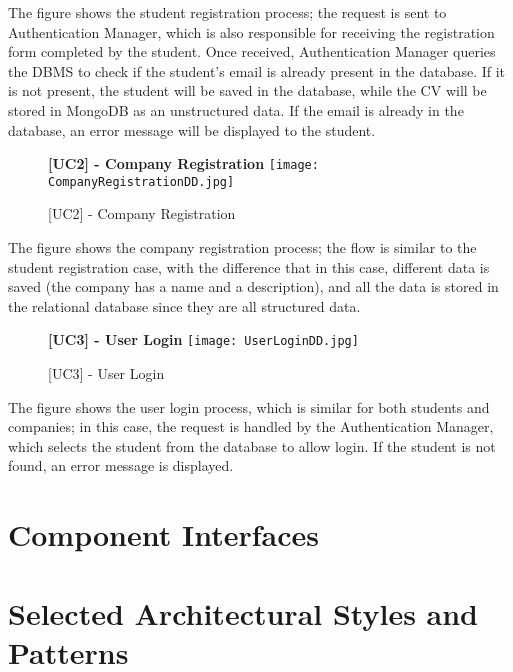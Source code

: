 		The figure shows the student registration process; the request is sent to Authentication Manager, which is also responsible for receiving the registration form completed by the student. Once received, Authentication Manager queries the DBMS to check if the student's email is already present in the database. If it is not present, the student will be saved in the database, while the CV will be stored in MongoDB as an unstructured data. If the email is already in the database, an error message will be displayed to the student.
		
		\begin{figure}[H]
			\centering
			{\bfseries [UC2] - Company Registration}
			\texttt{[image: CompanyRegistrationDD.jpg]}
			\caption{[UC2] - Company Registration}
		\end{figure}
		
		The figure shows the company registration process; the flow is similar to the student registration case, with the difference that in this case, different data is saved (the company has a name and a description), and all the data is stored in the relational database since they are all structured data.
		
		\begin{figure}[H]
			\centering
			{\bfseries [UC3] - User Login}
			\texttt{[image: UserLoginDD.jpg]}
			\caption{[UC3] - User Login}
			
		\end{figure}
		
		The figure shows the user login process, which is similar for both students and companies; in this case, the request is handled by the Authentication Manager, which selects the student from the database to allow login. If the student is not found, an error message is displayed.
		
		
		
		
		
		
		
		
		
		
		
		
		
		
		
		
	\section{Component Interfaces}
	\section{Selected Architectural Styles and Patterns}